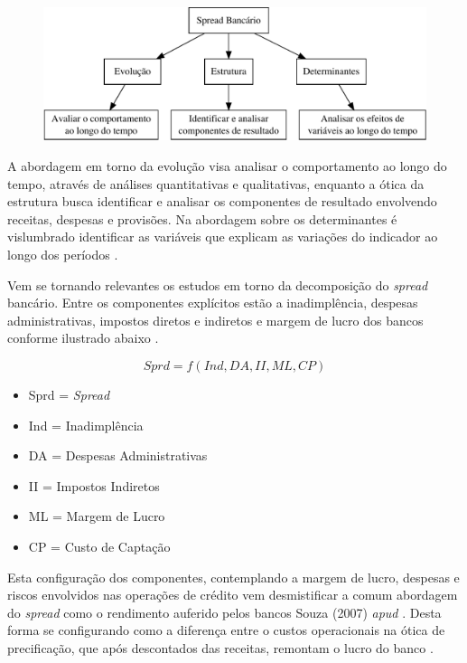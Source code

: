 \documentclass[12pt,12pt,openright,oneside,a4paper,chapter=TITLE,section=TITLE,subsection=TITLE,subsubsection=TITLE english,french,spanish,portugues,sumario=tradicional]{abntex2}
\providecommand{\tightlist}{%
  \setlength{\itemsep}{0pt}\setlength{\parskip}{0pt}}
\begin{document}
\begin{figure}

\begin{center}\includegraphics{12-exportedfigures/diagram.spread-1} \end{center}
\label{fig:diagram}
\end{figure}

A abordagem em torno da evolução visa analisar o comportamento ao longo do
tempo, através de análises quantitativas e qualitativas, enquanto a ótica da
estrutura busca identificar e analisar os componentes de resultado envolvendo
receitas, despesas e provisões. Na abordagem sobre os determinantes é
vislumbrado identificar as variáveis que explicam as variações do indicador ao
longo dos períodos \cite{leal:2006}.

Vem se tornando relevantes os estudos em torno da decomposição do \emph{spread}
bancário. Entre os componentes explícitos estão a inadimplência, despesas
administrativas, impostos diretos e indiretos e margem de lucro dos bancos
conforme ilustrado abaixo \cite{BCB:2000}.

\[
Sprd=f(Ind, DA, II, ML, CP)
\]

\begin{itemize}
\tightlist
\item
  Sprd = \emph{Spread}
\item
  Ind = Inadimplência
\item
  DA = Despesas Administrativas
\item
  II = Impostos Indiretos
\item
  ML = Margem de Lucro
\item
  CP = Custo de Captação
\end{itemize}

Esta configuração dos componentes, contemplando a margem de lucro, despesas e
riscos envolvidos nas operações de crédito vem desmistificar a comum abordagem
do \emph{spread} como o rendimento auferido pelos bancos \cite{costa;nakane:2004}
Souza (2007) \emph{apud} \cite{dantas:2012}. Desta forma se configurando como a
diferença entre o custos operacionais na ótica de precificação, que após
descontados das receitas, remontam o lucro do banco \cite{BCB:2016}.
\end{document}
